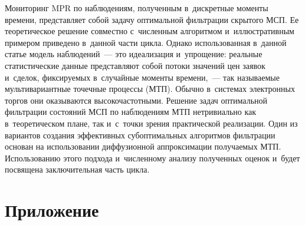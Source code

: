 \begin{multicols}{2}
\vspace*{-3pt}

Мониторинг MPR по наблюдениям, полученным в~дискретные моменты времени, 
представляет собой задачу оптимальной фильтрации скрытого МСП. Ее теоретическое 
решение совместно с~чис\-лен\-ным алгоритмом и~иллюстративным примером приведено в~данной час\-ти цик\-ла. 
Однако использованная в~данной статье модель наблюдений~--- 
это идеализация и~упрощение: реальные статистические данные представляют собой 
потоки \mbox{значений} цен заявок и~сделок, фик\-си\-ру\-емых в~случайные моменты времени,~--- 
так на\-зы\-ва\-емые мультивариантные точечные процессы (МТП). Обычно в~сис\-те\-мах электронных 
торгов они оказываются вы\-со\-ко\-час\-тот\-ны\-ми.
Решение задач оптимальной фильт\-ра\-ции со\-сто\-яний МСП по наблюдениям МТП  
нетривиально как в~тео\-ре\-ти\-че\-ском плане, так и~с~точ\-ки зрения практической 
реализации. Один из вариантов создания эффективных субоптимальных алгоритмов 
фильтрации основан на использовании диффузионной аппроксимации по\-лу\-ча\-емых МТП. 
Использованию этого подхода и~чис\-лен\-но\-му анализу полученных оценок и~будет 
посвящена заключительная часть цикла.


{\small
  \section*{\raggedleft Приложение}


}
\end{multicols}
